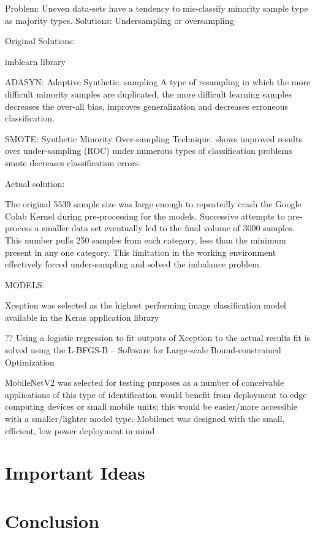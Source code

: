 \documentclass[]{article}
\begin{document}
Problem: Uneven data-sets have a tendency to mis-classify minority sample type as majority types.
Solutions: Undersampling or oversampling

Original Solutions:

imblearn library

ADASYN: Adaptive Synthetic. sampling
\cite{Bai2008} 
A type of resampling in which the more difficult minority samples are duplicated,
the more difficult learning samples decreases the over-all bias, improves generalization and decreases erroneous classification.

SMOTE: Synthetic Minority Over-sampling Technique.
\cite{Bowyer2011} shows improved results over under-sampling (ROC)
under numerous types of classification problems smote decreases classification errors.

Actual solution:

The original 5539 sample size was large enough to repeatedly crash the Google Colab Kernel during pre-processing for the models. Successive attempts to pre-process a smaller data set eventually led to the final volume of 3000 samples. This number pulls 250 samples from each category, less than the minimum present in any one category. This limitation in the working environment effectively forced under-sampling and solved the imbalance problem.



MODELS:

Xception \cite{Chollet2016}
was selected as the highest performing image classification model available in the Keras application library

?? Using a logistic regression to fit outputs of Xception to the actual results 
fit is solved using the L-BFGS-B – Software for Large-scale Bound-constrained Optimization \cite{Zhu1997}

MobileNetV2 \cite{Howard2017} \cite{Sandler2019}
was selected for testing purposes as a number of conceivable applications of this type of identification would benefit from deployment to edge computing devices or small mobile units; this would be easier/more accessible with a smaller/lighter model type.
Mobilenet was designed with the small, efficient, low power deployment in mind 

\section{Important Ideas}
	\subsection{}
	


	
\section{Conclusion}

\clearpage


\end{document}
